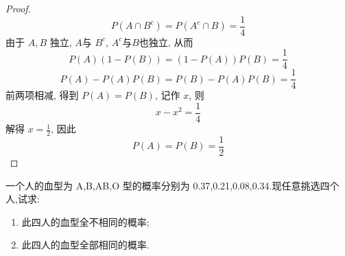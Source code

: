 \documentclass[../main.tex]{subfiles}
\begin{document}
\begin{proof}
    \[
    P\left( A\cap B^{c} \right)= P\left( A^{c}\cap B \right)= \frac{1 }{4 }   
    \]由于 \(  A,B  \) 独立, \(  A  \)与 \(  B^{c}  \), \(  A^{c}  \)与\(  B  \)也独立,     从而 \[
    P\left( A \right)\left( 1-P\left( B \right)  \right)= \left( 1-P\left( A \right)  \right)P\left( B \right)    = \frac{1 }{4 } 
    \] \[
    P\left( A \right)-P\left( A \right)P\left( B \right)= P\left( B \right)-P\left( A \right)P\left( B \right)= \frac{1 }{4 }       
    \]前两项相减, 得到 \(  P\left( A \right)= P\left( B \right)    \), 记作 \(  x  \), 则 \[
    x-x^{2}= \frac{1 }{4 } 
    \]  解得 \(  x= \frac{1 }{2 }   \), 因此 \[
    P\left( A \right)= P\left( B \right)= \frac{1 }{2 }   
    \] 
\end{proof}
\begin{exercise}{}{}
 一个人的血型为 A,B,AB,O 型的概率分别为 0.37,0.21,0.08,0.34.现任意挑选四个人,试求:
\begin{enumerate}
\item[(1)] 此四人的血型全不相同的概率;
\item[(2)] 此四人的血型全部相同的概率.
\end{enumerate}
\end{exercise}
\end{document}
